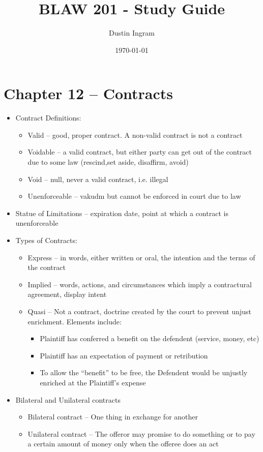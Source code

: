 \documentclass{article}
\title{BLAW 201 - Study Guide}
\author{Dustin Ingram}
\date{\today}
\begin{document}
	\maketitle
	\section{Chapter 12 -- Contracts}
	\begin{itemize}
		\item Contract Definitions:
		\begin{itemize}
			\item Valid -- good, proper contract. A non-valid contract is not a contract
			\item Voidable -- a valid contract, but either party can get out of the contract due to some law (rescind,set aside, disaffirm, avoid)
			\item Void -- null, never a valid contract, i.e. illegal
			\item Unenforceable -- vakudm but cannot be enforced in court due to law
		\end{itemize}
		\item Statue of Limitations -- expiration date, point at which a contract is unenforceable
		\item Types of Contracts:
		\begin{itemize}
			\item Express -- in words, either written or oral, the intention and the terms of the contract
			\item Implied -- words, actions, and circumstances which imply a contractural agreement, display intent
			\item Quasi -- Not a contract, doctrine created by the court to prevent unjust enrichment. Elements include:
			\begin{itemize}
				\item Plaintiff has conferred a benefit on the defendent (service, money, etc)
				\item Plaintiff has an expectation of payment or retribution
				\item To allow the ``benefit'' to be free, the Defendent would be unjustly enriched at the Plaintiff's expense
			\end{itemize}
		\end{itemize}
		\item Bilateral and Unilateral contracts
		\begin{itemize}
			\item Bilateral contract -- One thing in exchange for another
			\item Unilateral contract -- The offeror may promise to do something or to pay a certain amount of money only when the offeree does an act
		\end{itemize}
	\end{itemize}
\end{document}
